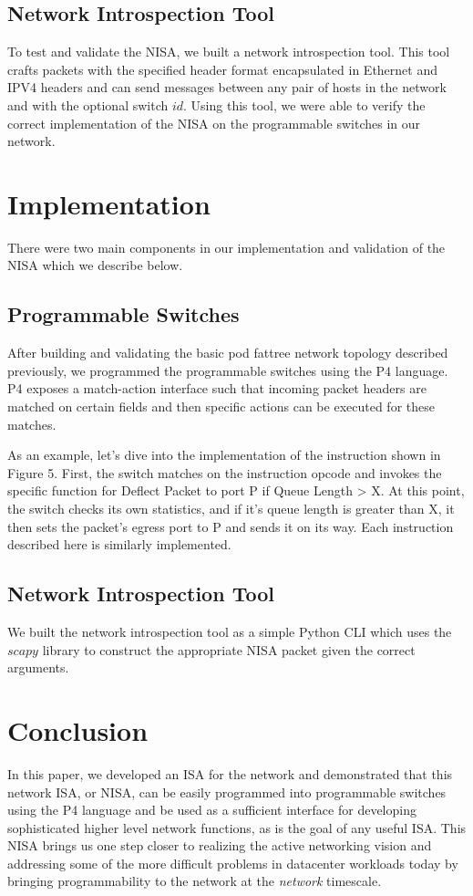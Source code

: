 \subsection{Network Introspection Tool}

To test and validate the NISA, we built a network introspection tool. This tool crafts packets with the specified header format encapsulated in Ethernet and IPV4 headers and can send messages between any pair of hosts in the network and with the optional switch $id$. Using this tool, we were able to verify the correct implementation of the NISA on the programmable switches in our network.

\section{Implementation}

There were two main components in our implementation and validation of the NISA which we describe below.

\subsection{Programmable Switches}

After building and validating the basic pod fattree network topology described previously, we programmed the programmable switches using the P4 language. P4 exposes a match-action interface such that incoming packet headers are matched on certain fields and then specific actions can be executed for these matches. 

As an example, let's dive into the implementation of the instruction shown in Figure 5. First, the switch matches on the instruction opcode and invokes the specific function for Deflect Packet to port P if Queue Length > X. At this point, the switch checks its own statistics, and if it's queue length is greater than X, it then sets the packet's egress port to P and sends it on its way. Each instruction described here is similarly implemented.

\subsection{Network Introspection Tool}

We built the network introspection tool as a simple Python CLI which uses the $scapy$ library to construct the appropriate NISA packet given the correct arguments.

\section{Conclusion}

In this paper, we developed an ISA for the network and demonstrated that this network ISA, or NISA, can be easily programmed into programmable switches using the P4 language and be used as a sufficient interface for developing sophisticated higher level network functions, as is the goal of any useful ISA. This NISA brings us one step closer to realizing the active networking vision and addressing some of the more difficult problems in datacenter workloads today by bringing programmability to the network at the \emph{network} timescale.
